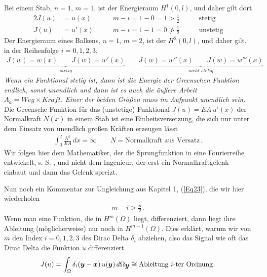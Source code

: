 Bei einem Stab, $n = 1$, $m = 1$, ist der Energieraum $H^1(0,l)$, und daher gilt dort
\begin{alignat}{2}
J(u) &= u(x) \qquad &m - i = 1 - 0 = 1 > \frac{1}{2} \qquad &\text{stetig} \\
J(u) &= u'(x)\qquad &m - i = 1 - 1 = 0 \ngtr \frac{1}{2} \qquad &\text{unstetig}
\end{alignat}
Der Energieraum eines Balkens, $n = 1$, $m = 2$, ist der $H^2(0,l)$, und daher gilt, in der Reihenfolge $i = 0, 1, 2, 3$,
\begin{align}\label{Eq21}
\underbrace{J(w) = w(x) \qquad J(w) = w'(x)}_{stetig} \qquad \underbrace{J(w) = w''(x) \qquad J(w) = w'''(x)}_{nicht\,\, stetig}
\end{align}
{\em Wenn ein Funktional stetig ist, dann ist die Energie der Greenschen Funktion endlich, sonst unendlich und dann ist es auch die \"{a}u{\ss}ere Arbeit $A_a = Weg \times Kraft$. Einer der beiden Gr\"{o}{\ss}en muss im Aufpunkt unendlich sein\/}.\\

Die Greensche Funktion f\"{u}r das (unstetige) Funktional $J(u) = EA\,u'(x)$ der Normalkraft $N(x)$ in einem Stab ist eine Einheitsversetzung, die sich nur unter dem Einsatz von unendlich gro{\ss}en Kr\"{a}ften erzeugen l\"{a}sst
\begin{align}
\int_0^{\,l} \frac{N^2}{EA}\,dx = \infty \qquad N = \text{Normalkraft aus Versatz}\,.
\end{align}
Wir folgen hier dem Mathematiker, der die Sprungfunktion in eine Fourierreihe entwickelt, s. S. \pageref{Fourierreihe}, und nicht dem Ingenieur, der erst ein Normalkraftgelenk einbaut und dann das Gelenk spreizt.

Nun noch ein Kommentar zur Ungleichung aus Kapitel 1, (\ref{Eq23}), die wir hier wiederholen
\begin{align}
m - i > \frac{n}{2}\,.
\end{align}
Wenn man eine Funktion, die in $H^m(\Omega)$ liegt, differenziert, dann liegt ihre Ableitung (m\"{o}glicherweise) nur noch in $H^{m-1}(\Omega)$. Dies erkl\"{a}rt, warum wir von $m$ den Index $i = 0, 1, 2, 3$ des Dirac Delta $\delta_i$ abziehen, also das Signal wie oft das Dirac Delta die Funktion $u$ differenziert
\begin{align}
J(u) = \int_{\Omega} \delta_i(\mbox{\boldmath $y$} - \mbox{\boldmath $x$})\,u(\mbox{\boldmath $y$})\,d\Omega_{\mbox{\boldmath $y$}} \cong \text{Ableitung $i$-ter Ordnung}\,.
\end{align}

